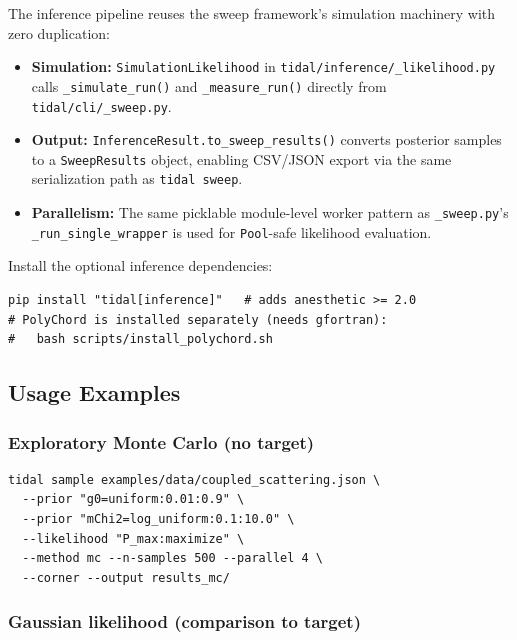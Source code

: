 The inference pipeline reuses the sweep framework's simulation machinery
with zero duplication:

\begin{itemize}
  \item \textbf{Simulation:} \texttt{SimulationLikelihood} in
    \texttt{tidal/inference/\_likelihood.py} calls \texttt{\_simulate\_run()} and
    \texttt{\_measure\_run()} directly from \texttt{tidal/cli/\_sweep.py}.
  \item \textbf{Output:} \texttt{InferenceResult.to\_sweep\_results()} converts
    posterior samples to a \texttt{SweepResults} object, enabling CSV/JSON
    export via the same serialization path as \texttt{tidal sweep}.
  \item \textbf{Parallelism:} The same picklable module-level worker pattern as
    \texttt{\_sweep.py}'s \texttt{\_run\_single\_wrapper} is used for \texttt{Pool}-safe
    likelihood evaluation.
\end{itemize}

Install the optional inference dependencies:

\begin{lstlisting}[style=bash]
pip install "tidal[inference]"   # adds anesthetic >= 2.0
# PolyChord is installed separately (needs gfortran):
#   bash scripts/install_polychord.sh
\end{lstlisting}

\subsection{Usage Examples}
\label{sec:inference-examples}

\subsubsection{Exploratory Monte Carlo (no target)}

\begin{lstlisting}[style=bash]
tidal sample examples/data/coupled_scattering.json \
  --prior "g0=uniform:0.01:0.9" \
  --prior "mChi2=log_uniform:0.1:10.0" \
  --likelihood "P_max:maximize" \
  --method mc --n-samples 500 --parallel 4 \
  --corner --output results_mc/
\end{lstlisting}

\subsubsection{Gaussian likelihood (comparison to target)}

